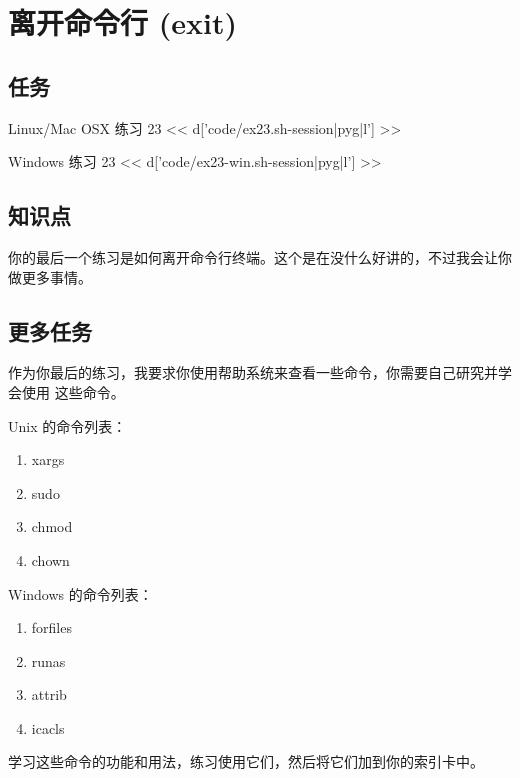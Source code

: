 \chapter{离开命令行 (exit)}

\section{任务}

\begin{code}{Linux/Mac OSX 练习 23}
<< d['code/ex23.sh-session|pyg|l'] >>
\end{code}

\begin{code}{Windows 练习 23}
<< d['code/ex23-win.sh-session|pyg|l'] >>
\end{code}

\section{知识点}

你的最后一个练习是如何离开命令行终端。这个是在没什么好讲的，不过我会让你做更多事情。

\section{更多任务}

作为你最后的练习，我要求你使用帮助系统来查看一些命令，你需要自己研究并学会使用
这些命令。

Unix 的命令列表：

\begin{enumerate}
\item xargs
\item sudo
\item chmod
\item chown
\end{enumerate}

Windows 的命令列表：

\begin{enumerate}
\item forfiles
\item runas
\item attrib
\item icacls
\end{enumerate}

学习这些命令的功能和用法，练习使用它们，然后将它们加到你的索引卡中。